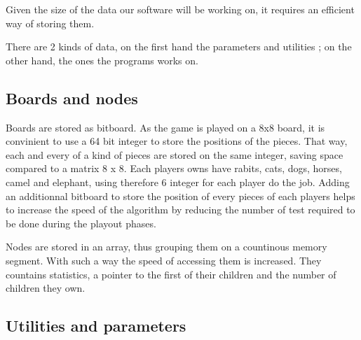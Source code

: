 Given the size of the data our software will be working on, it requires an efficient way of storing them.

There are 2 kinds of data, on the first hand the parameters and utilities ; on the other hand, the ones the programs works on.
\subsection{Boards and nodes}
Boards are stored as bitboard. As the game is played on a 8x8 board, it is convinient to use a 64 bit integer to store the positions of the pieces.
That way, each and every of a kind of pieces are stored on the same integer, saving space compared to a matrix 8 x 8.
Each players owns have rabits, cats, dogs, horses, camel and elephant, using therefore 6 integer for each player do the job. Adding an additionnal bitboard to store the position of every pieces of each players helps to increase the speed of the algorithm by reducing the number of test required to be done during the playout phases.

Nodes are stored in an array, thus grouping them on a countinous memory segment. With such a way the speed of accessing them is increased.
They countains statistics, a pointer to the first of their children and the number of children they own.


\subsection{Utilities and parameters}
